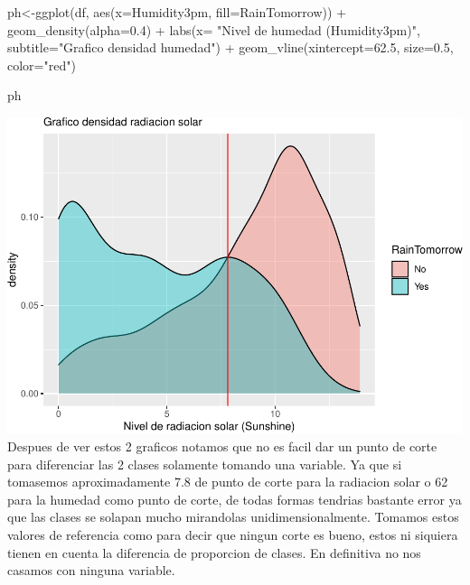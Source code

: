 \documentclass[
]{article}
\newenvironment{Shaded}{\begin{snugshade}}{\end{snugshade}}
\newcommand{\AttributeTok}[1]{\textcolor[rgb]{0.77,0.63,0.00}{#1}}
\newcommand{\FloatTok}[1]{\textcolor[rgb]{0.00,0.00,0.81}{#1}}
\newcommand{\FunctionTok}[1]{\textcolor[rgb]{0.00,0.00,0.00}{#1}}
\newcommand{\NormalTok}[1]{#1}
\newcommand{\OtherTok}[1]{\textcolor[rgb]{0.56,0.35,0.01}{#1}}
\newcommand{\SpecialCharTok}[1]{\textcolor[rgb]{0.00,0.00,0.00}{#1}}
\newcommand{\StringTok}[1]{\textcolor[rgb]{0.31,0.60,0.02}{#1}}
\begin{document}
\begin{Shaded}
\begin{Highlighting}[]
\NormalTok{ph}\OtherTok{\textless{}{-}}\FunctionTok{ggplot}\NormalTok{(df, }\FunctionTok{aes}\NormalTok{(}\AttributeTok{x=}\NormalTok{Humidity3pm, }\AttributeTok{fill=}\NormalTok{RainTomorrow)) }\SpecialCharTok{+}
  \FunctionTok{geom\_density}\NormalTok{(}\AttributeTok{alpha=}\FloatTok{0.4}\NormalTok{) }\SpecialCharTok{+} \FunctionTok{labs}\NormalTok{(}\AttributeTok{x=} \StringTok{"Nivel de humedad (Humidity3pm)"}\NormalTok{,}
       \AttributeTok{subtitle=}\StringTok{"Grafico densidad humedad"}\NormalTok{) }\SpecialCharTok{+} \FunctionTok{geom\_vline}\NormalTok{(}\AttributeTok{xintercept=}\FloatTok{62.5}\NormalTok{, }\AttributeTok{size=}\FloatTok{0.5}\NormalTok{, }\AttributeTok{color=}\StringTok{"red"}\NormalTok{)}

\NormalTok{ph}
\end{Highlighting}
\end{Shaded}

\includegraphics{tpEstadistica_files/figure-latex/unnamed-chunk-11-1.pdf}
Despues de ver estos 2 graficos notamos que no es facil dar un punto de
corte para diferenciar las 2 clases solamente tomando una variable. Ya
que si tomasemos aproximadamente 7.8 de punto de corte para la radiacion
solar o 62 para la humedad como punto de corte, de todas formas tendrias
bastante error ya que las clases se solapan mucho mirandolas
unidimensionalmente. Tomamos estos valores de referencia como para decir
que ningun corte es bueno, estos ni siquiera tienen en cuenta la
diferencia de proporcion de clases. En definitiva no nos casamos con
ninguna variable.
\end{document}
